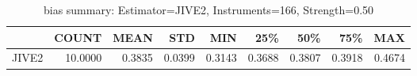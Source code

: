 \begin{table}[ht]
\centering
\caption{bias summary: Estimator=JIVE2, Instruments=166, Strength=0.50}
\begin{tabular}{lrrrrrrrr}
\toprule
 & COUNT & MEAN & STD & MIN & 25\% & 50\% & 75\% & MAX \\
\midrule
JIVE2 & 10.0000 & 0.3835 & 0.0399 & 0.3143 & 0.3688 & 0.3807 & 0.3918 & 0.4674 \\
\bottomrule
\end{tabular}
\end{table}

